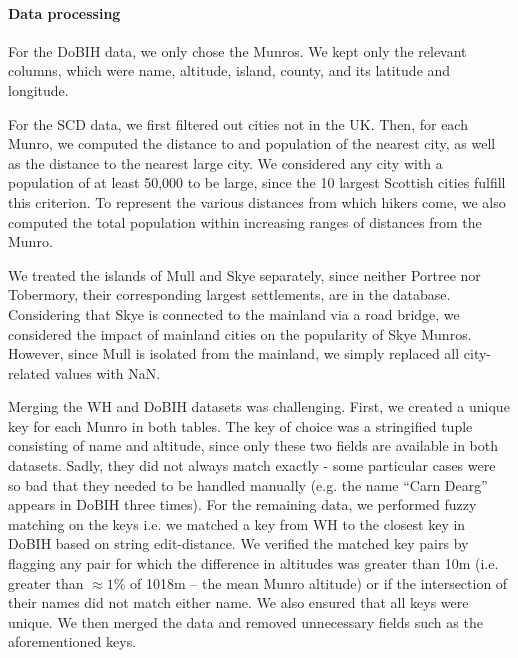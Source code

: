 \documentclass[11pt,a4paper]{article}
\begin{document}
\paragraph{Data processing}

For the DoBIH data, we only chose the Munros. We kept only the relevant columns, which were name, altitude, island, county, and its latitude and longitude.

For the SCD data, we first filtered out cities not in the UK. Then, for each Munro, we computed the distance to and population of the nearest city, as well as the distance to the nearest large city. We considered any city with a population of at least 50,000 to be large, since the 10 largest Scottish cities fulfill this criterion. To represent the various distances from which hikers come, we also computed the total population within increasing ranges of distances from the Munro.

We treated the islands of Mull and Skye separately, since neither Portree nor Tobermory, their corresponding largest settlements, are in the database. Considering that Skye is connected to the mainland via a road bridge, we considered the impact of mainland cities on the popularity of Skye Munros. However, since Mull is isolated from the mainland, we simply replaced all city-related values with NaN.

Merging the WH and DoBIH datasets was challenging. First, we created a unique key for each Munro in both tables. The key of choice was a stringified tuple consisting of name and altitude, since only these two fields are available in both datasets. Sadly, they did not always match exactly - some particular cases were so bad that they needed to be handled manually (e.g. the name “Carn Dearg” appears in DoBIH three times). For the remaining data, we performed fuzzy matching on the keys i.e. we matched a key from WH to the closest key in DoBIH based on string edit-distance. We verified the matched key pairs by flagging any pair for which the difference in altitudes was greater than 10m (i.e. greater than $\approx1\%$ of 1018m – the mean Munro altitude) or if the intersection of their names did not match either name. We also ensured that all keys were unique. We then merged the data and removed unnecessary fields such as the aforementioned keys.
\end{document}
